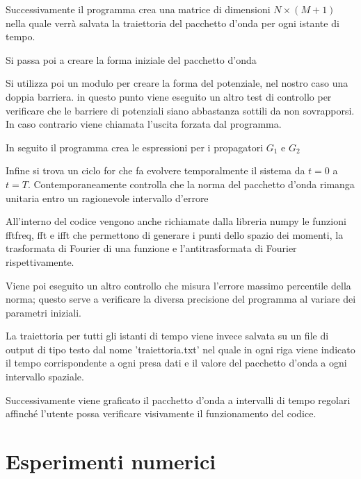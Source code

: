 \documentclass[12pt,onecolumn,a4paper]{memoir}
\begin{document}
Successivamente il programma crea una matrice di dimensioni $N\times (M+1)$ nella quale verrà salvata la traiettoria del pacchetto d'onda per ogni istante di tempo.\newline

Si passa poi a creare la forma iniziale del pacchetto d'onda\newline

Si utilizza poi un modulo per creare la forma del potenziale, nel nostro caso una doppia barriera.
in questo punto viene eseguito un altro test di controllo per verificare che le barriere di potenziali siano abbastanza sottili da non sovrapporsi. In caso contrario viene chiamata l'uscita forzata dal programma.\newline

In seguito il programma crea le espressioni per i propagatori $G_1$ e $G_2$\newline

Infine si trova un ciclo for che fa evolvere temporalmente il sistema da $t=0$ a $t=T$. Contemporaneamente controlla che la norma del pacchetto d'onda rimanga unitaria entro un ragionevole intervallo d'errore\newline


All'interno del codice vengono anche richiamate dalla libreria numpy le funzioni fftfreq, fft e ifft che permettono di generare i punti dello spazio dei momenti, la trasformata di Fourier di una funzione e l'antitrasformata di Fourier rispettivamente.\newline



Viene poi eseguito un altro controllo che misura l'errore massimo percentile della norma; questo serve a verificare la diversa precisione del programma al variare dei parametri iniziali.\newline

La traiettoria per tutti gli istanti di tempo viene invece salvata su un file di output di tipo testo dal nome 'traiettoria.txt' nel quale in ogni riga viene indicato il tempo corrispondente a ogni presa dati e il valore del pacchetto d'onda a ogni intervallo spaziale.\newline

Successivamente viene graficato il pacchetto d'onda a intervalli di tempo regolari affinché l'utente possa verificare visivamente il funzionamento del codice.\newline

\section*{Esperimenti numerici}
\end{document}
